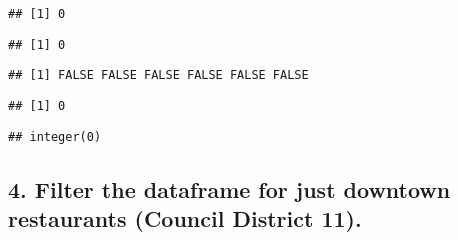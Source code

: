 \documentclass[
]{article}
\newenvironment{Shaded}{\begin{snugshade}}{\end{snugshade}}
\newcommand{\AttributeTok}[1]{\textcolor[rgb]{0.77,0.63,0.00}{#1}}
\newcommand{\ConstantTok}[1]{\textcolor[rgb]{0.00,0.00,0.00}{#1}}
\newcommand{\FunctionTok}[1]{\textcolor[rgb]{0.00,0.00,0.00}{#1}}
\newcommand{\NormalTok}[1]{#1}
\newcommand{\SpecialCharTok}[1]{\textcolor[rgb]{0.00,0.00,0.00}{#1}}
\newcommand{\StringTok}[1]{\textcolor[rgb]{0.31,0.60,0.02}{#1}}
\begin{document}
\begin{verbatim}
## [1] 0
\end{verbatim}

\begin{Shaded}
\end{Shaded}

\begin{verbatim}
## [1] 0
\end{verbatim}

\begin{Shaded}
\end{Shaded}

\begin{verbatim}
## [1] FALSE FALSE FALSE FALSE FALSE FALSE
\end{verbatim}

\begin{Shaded}
\end{Shaded}

\begin{verbatim}
## [1] 0
\end{verbatim}

\begin{Shaded}
\end{Shaded}

\begin{verbatim}
## integer(0)
\end{verbatim}

\hypertarget{filter-the-dataframe-for-just-downtown-restaurants-council-district-11.}{%
\subsection{4. Filter the dataframe for just downtown restaurants
(Council District
11).}\label{filter-the-dataframe-for-just-downtown-restaurants-council-district-11.}}
\end{document}

